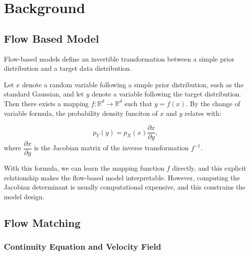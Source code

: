 \section{Background}
\subsection{Flow Based Model}

Flow-based models define an invertible transformation between a simple prior distribution and a target data distribution.

Let $x$ denote a random variable following a simple prior distribution, such as the standard Gaussian, and let $y$ denote a variable following the target distribution. Then there exists a mapping $f: \mathbb{R}^d \to \mathbb{R}^d$ such that $y = f(x)$.
By the change of variable formula, the probability density funciton of $x$ and $y$ relates with:

\begin{equation}
  p_Y(y) = p_X(x) \frac{\partial x}{\partial y},
\end{equation}
%
where $\dfrac{\partial x}{\partial y}$ is the Jacobian matrix of the inverse transformation $f^{-1}$.

With this formula, we can learn the mapping function $f$ directly, and this explicit relationship makes the flow-based model interpretable. However, computing the Jacobian determinant is usually computational expensive, and this constrains the model design.

\subsection{Flow Matching}

\subsubsection{Continuity Equation and Velocity Field}


